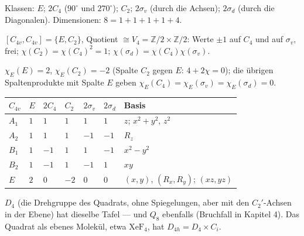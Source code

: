 \begin{merksatz}
Klassen: $E$; $2C_4$ ($90^{\circ}$ und $270^{\circ}$); $C_2$; $2\sigma_v$ (durch die Achsen); $2\sigma_d$ (durch die Diagonalen). Dimensionen: $8 = 1 + 1 + 1 + 1 + 4$.

$[C_{4v}, C_{4v}] = \{E, C_2\}$, Quotient $\cong V_4 = \mathbb Z/2\times\mathbb Z/2$: Werte $\pm1$ auf $C_4$ und auf $\sigma_v$, frei; $\chi(C_2) = \chi(C_4)^{2} = 1$; $\chi(\sigma_d) = \chi(C_4)\chi(\sigma_v)$.

$\chi_E(E) = 2$, $\chi_E(C_2) = -2$ (Spalte $C_2$ gegen $E$: $4 + 2\chi = 0$); die übrigen Spaltenprodukte mit Spalte $E$ geben $\chi_E(C_4) = \chi_E(\sigma_v) = \chi_E(\sigma_d) = 0$.

\begin{center}
{\small
\renewcommand{\arraystretch}{1.46}
\begin{tabular}{@{}P{1.2cm}P{0.7cm}P{0.9cm}P{0.8cm}P{0.9cm}P{0.9cm}P{3.0cm}@{}}
\toprule
$C_{4v}$ & $E$ & $2C_4$ & $C_2$ & $2\sigma_v$ & $2\sigma_d$ & \textbf{Basis}\\
\midrule
$A_1$ & $1$ & $1$ & $1$ & $1$ & $1$ & $z$; $x^{2} + y^{2}$, $z^{2}$\\
$A_2$ & $1$ & $1$ & $1$ & $-1$ & $-1$ & $R_z$\\
$B_1$ & $1$ & $-1$ & $1$ & $1$ & $-1$ & $x^{2} - y^{2}$\\
$B_2$ & $1$ & $-1$ & $1$ & $-1$ & $1$ & $xy$\\
$E$ & $2$ & $0$ & $-2$ & $0$ & $0$ & $(x, y)$, $(R_x, R_y)$; $(xz, yz)$\\
\bottomrule
\end{tabular}}
\end{center}
$D_4$ (die Drehgruppe des Quadrats, ohne Spiegelungen, aber mit den $C_2'$-Achsen in der Ebene) hat dieselbe Tafel --- und $Q_8$ ebenfalls (Bruchfall in Kapitel 4). Das Quadrat als ebenes Molekül, etwa $\mathrm{XeF_4}$, hat $D_{4h} = D_4\times C_i$.
\end{merksatz}

